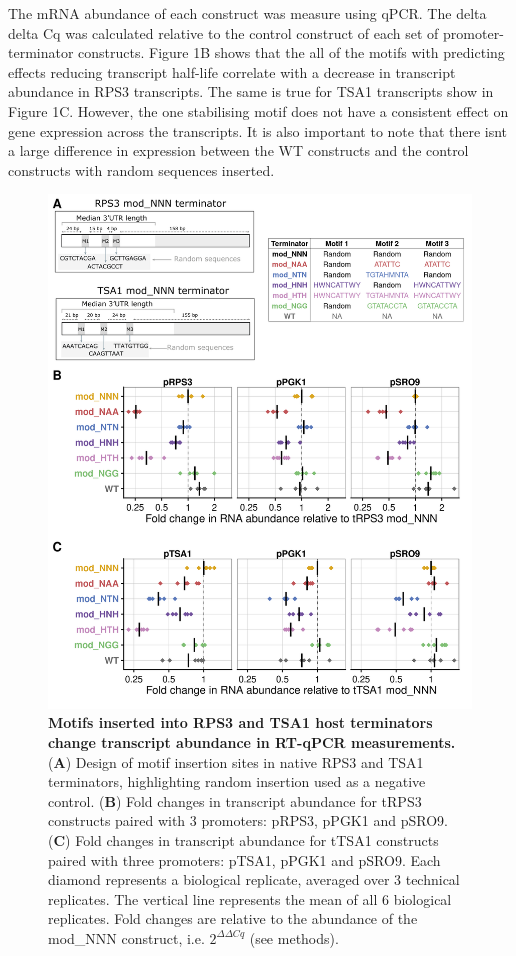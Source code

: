 \documentclass{SBCbookchapter}
\begin{document}
The mRNA abundance of each construct was measure using qPCR. The delta delta Cq was calculated relative to the control construct of each set of promoter-terminator constructs. Figure 1B shows that the all of the motifs with predicting effects reducing transcript half-life correlate with a decrease in transcript abundance in RPS3 transcripts. The same is true for TSA1 transcripts show in Figure 1C. However, the one stabilising motif does not have a consistent effect on gene expression across the transcripts. It is also important to note that there isnt a large difference in expression between the WT constructs and the control constructs with random sequences inserted.  

\begin{figure}[p]

{\centering \includegraphics[width=0.98\linewidth]{figures/insertion_constructs_design_and_qpcr} 

}

\caption{\textbf{Motifs inserted into RPS3 and TSA1 host terminators change transcript abundance in RT-qPCR measurements.} (\textbf{A}) Design of motif insertion sites in native RPS3 and TSA1 terminators, highlighting random insertion used as a negative control. (\textbf{B}) Fold changes in transcript abundance for tRPS3 constructs paired with 3 promoters: pRPS3, pPGK1 and pSRO9. (\textbf{C}) Fold changes in transcript abundance for tTSA1 constructs paired with three promoters: pTSA1, pPGK1 and pSRO9. Each diamond represents a biological replicate, averaged over 3 technical replicates. The vertical line represents the mean of all 6 biological replicates. Fold changes are relative to the abundance of the mod\_NNN construct, i.e. $2^{\Delta\Delta Cq}$ (see methods).}\label{fig:tRPS3-tTSA1-design-and-qpcr}
\end{figure}
\end{document}
